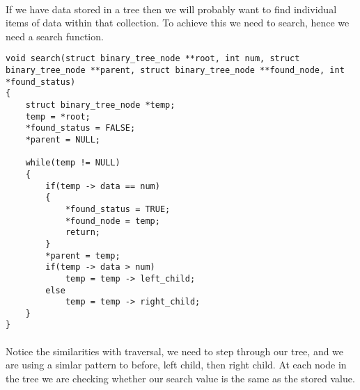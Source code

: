 \documentclass[10pt, a4paper, twosize]{article}
\begin{document}
\paragraph{} If we have data stored in a tree then we will probably want to find individual items of data within that collection. To achieve this we need to search, hence we need a search function.
\begin{lstlisting}
void search(struct binary_tree_node **root, int num, struct binary_tree_node **parent, struct binary_tree_node **found_node, int *found_status)
{
    struct binary_tree_node *temp;
    temp = *root;
    *found_status = FALSE;
    *parent = NULL;

    while(temp != NULL)
    {
        if(temp -> data == num)
        {
            *found_status = TRUE;
            *found_node = temp;
            return;
        }
        *parent = temp;
        if(temp -> data > num)
            temp = temp -> left_child;
        else
            temp = temp -> right_child;
    }
}
\end{lstlisting}
\paragraph{} Notice the similarities with traversal, we need to step through our tree, and we are using a simlar pattern to before, left child, then right child. At each node in the tree we are checking whether our search value is the same as the stored value.
\end{document}
